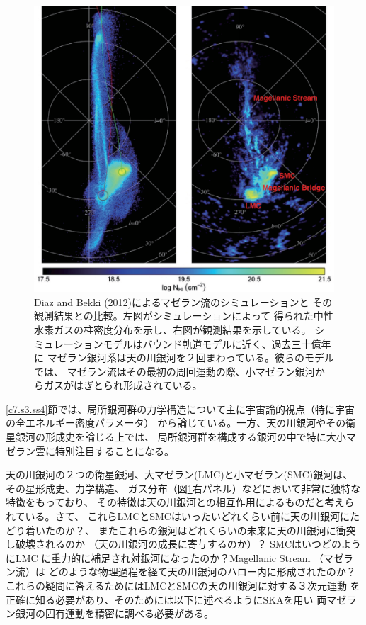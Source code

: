 \begin{figure}[t]
\begin{center}
\includegraphics[width=0.8\linewidth]{astrometry/bekki_MCs.eps}
\end{center}
\vspace{-7mm}
\caption{Diaz and Bekki (2012)によるマゼラン流のシミュレーションと
その観測結果\citep{2003ApJ...586..170P}との比較。左図がシミュレーションによって
得られた中性水素ガスの柱密度分布を示し、右図が観測結果を示している。
シミュレーションモデルはバウンド軌道モデルに近く、過去三十億年に
マゼラン銀河系は天の川銀河を２回まわっている。彼らのモデルでは、
マゼラン流はその最初の周回運動の際、小マゼラン銀河からガスがはぎとられ形成されている。}
\label{c7.s4.f16}
\end{figure}

\ref{c7.s3.ss4}節では、局所銀河群の力学構造について主に宇宙論的視点（特に宇宙の全エネルギー密度パラメータ）
から論じている。一方、天の川銀河やその衛星銀河の形成史を論じる上では、
局所銀河群を構成する銀河の中で特に大小マゼラン雲に特別注目することになる。

天の川銀河の２つの衛星銀河、大マゼラン(LMC)と小マゼラン(SMC)銀河は、その星形成史、力学構造、
ガス分布（図\ref{c7.s4.f16}右パネル）などにおいて非常に独特な特徴をもっており、
その特徴は天の川銀河との相互作用によるものだと考えられている。さて、
これらLMCとSMCはいったいどれくらい前に天の川銀河にたどり着いたのか？、
またこれらの銀河はどれくらいの未来に天の川銀河に衝突し破壊されるのか
（天の川銀河の成長に寄与するのか）？
SMCはいつどのようにLMC
に重力的に補足され対銀河になったのか？Magellanic Stream （マゼラン流）は
どのような物理過程を経て天の川銀河のハロー内に形成されたのか？
これらの疑問に答えるためにはLMCとSMCの天の川銀河に対する３次元運動
を正確に知る必要があり、そのためには以下に述べるようにSKAを用い
両マゼラン銀河の固有運動を精密に調べる必要がある。

